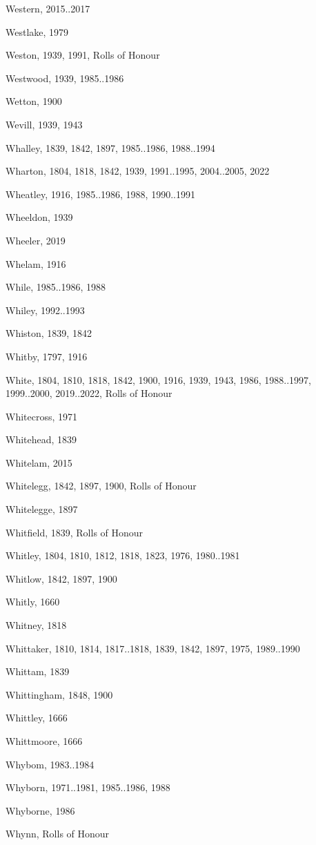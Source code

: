 \begin{theindex}
\item Western, 2015..2017
\item Westlake, 1979
\item Weston, 1939, 1991, Rolls of Honour
\item Westwood, 1939, 1985..1986
\item Wetton, 1900
\item Wevill, 1939, 1943
\item Whalley, 1839, 1842, 1897, 1985..1986, 1988..1994
\item Wharton, 1804, 1818, 1842, 1939, 1991..1995, 2004..2005, 2022
\item Wheatley, 1916, 1985..1986, 1988, 1990..1991
\item Wheeldon, 1939
\item Wheeler, 2019
\item Whelam, 1916
\item While, 1985..1986, 1988
\item Whiley, 1992..1993
\item Whiston, 1839, 1842
\item Whitby, 1797, 1916
\item White, 1804, 1810, 1818, 1842, 1900, 1916, 1939, 1943, 1986, 1988..1997, 1999..2000, 2019..2022, Rolls of Honour
\item Whitecross, 1971
\item Whitehead, 1839
\item Whitelam, 2015
\item Whitelegg, 1842, 1897, 1900, Rolls of Honour
\item Whitelegge, 1897
\item Whitfield, 1839, Rolls of Honour
\item Whitley, 1804, 1810, 1812, 1818, 1823, 1976, 1980..1981
\item Whitlow, 1842, 1897, 1900
\item Whitly, 1660
\item Whitney, 1818
\item Whittaker, 1810, 1814, 1817..1818, 1839, 1842, 1897, 1975, 1989..1990
\item Whittam, 1839
\item Whittingham, 1848, 1900
\item Whittley, 1666
\item Whittmoore, 1666
\item Whybom, 1983..1984
\item Whyborn, 1971..1981, 1985..1986, 1988
\item Whyborne, 1986
\item Whynn, Rolls of Honour

\end{theindex}

